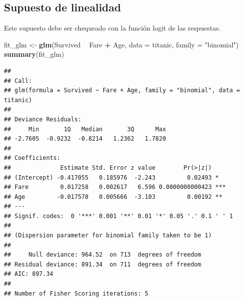 \documentclass[
  12pt,
]{book}
\newenvironment{Shaded}{\begin{snugshade}}{\end{snugshade}}
\newcommand{\DataTypeTok}[1]{\textcolor[rgb]{0.13,0.29,0.53}{#1}}
\newcommand{\KeywordTok}[1]{\textcolor[rgb]{0.13,0.29,0.53}{\textbf{#1}}}
\newcommand{\NormalTok}[1]{#1}
\newcommand{\OperatorTok}[1]{\textcolor[rgb]{0.81,0.36,0.00}{\textbf{#1}}}
\newcommand{\StringTok}[1]{\textcolor[rgb]{0.31,0.60,0.02}{#1}}
\theoremstyle{definition}
\theoremstyle{definition}
\theoremstyle{definition}
\theoremstyle{remark}
\begin{document}
\hypertarget{supuesto-de-linealidad}{%
\subsection{Supuesto de linealidad}\label{supuesto-de-linealidad}}

Este supuesto debe ser chequeado con la función logit de las respuestas.

\begin{Shaded}
\begin{Highlighting}[]
\NormalTok{fit_glm <-}\StringTok{ }\KeywordTok{glm}\NormalTok{(Survived }\OperatorTok{~}\StringTok{ }\NormalTok{Fare }\OperatorTok{+}\StringTok{ }\NormalTok{Age, }\DataTypeTok{data =}\NormalTok{ titanic, }
    \DataTypeTok{family =} \StringTok{"binomial"}\NormalTok{)}
\KeywordTok{summary}\NormalTok{(fit_glm)}
\end{Highlighting}
\end{Shaded}

\begin{verbatim}
## 
## Call:
## glm(formula = Survived ~ Fare + Age, family = "binomial", data = titanic)
## 
## Deviance Residuals: 
##     Min       1Q   Median       3Q      Max  
## -2.7605  -0.9232  -0.8214   1.2362   1.7820  
## 
## Coefficients:
##              Estimate Std. Error z value        Pr(>|z|)    
## (Intercept) -0.417055   0.185976  -2.243         0.02493 *  
## Fare         0.017258   0.002617   6.596 0.0000000000423 ***
## Age         -0.017578   0.005666  -3.103         0.00192 ** 
## ---
## Signif. codes:  0 '***' 0.001 '**' 0.01 '*' 0.05 '.' 0.1 ' ' 1
## 
## (Dispersion parameter for binomial family taken to be 1)
## 
##     Null deviance: 964.52  on 713  degrees of freedom
## Residual deviance: 891.34  on 711  degrees of freedom
## AIC: 897.34
## 
## Number of Fisher Scoring iterations: 5
\end{verbatim}
\end{document}
